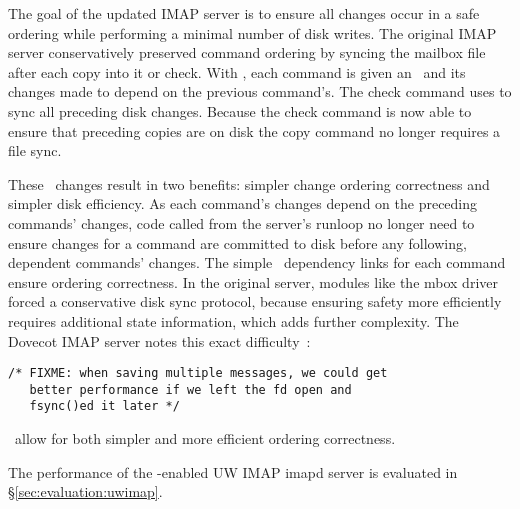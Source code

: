 The goal of the updated IMAP server is to ensure all changes occur in
a safe ordering while performing a minimal number of disk writes.  The
original IMAP server conservatively preserved command ordering by
syncing the mailbox file after each copy into it or check. With
\opgroups, each command is given an \opgroup\ and its changes made to
depend on the previous command's. The check command uses \opgroupSync
to sync all preceding disk changes. Because the check command is now
able to ensure that preceding copies are on disk the copy command no
longer requires a file sync.

These \opgroup\ changes result in two benefits: simpler change
ordering correctness and simpler disk efficiency. As each command's
changes depend on the preceding commands' changes, code called from
the server's runloop no longer need to ensure changes for a command
are committed to disk before any following, dependent commands'
changes. The simple \opgroup\ dependency links for each command ensure
ordering correctness. In the original server, modules like the mbox
driver forced a conservative disk sync protocol, because ensuring
safety more efficiently requires additional state information, which adds
further complexity. The Dovecot IMAP server notes this exact
difficulty~\cite[maildir-save.c]{dovecot}:

\vspace{-0.5\baselineskip}
\begin{scriptsize}
\begin{verbatim}
/* FIXME: when saving multiple messages, we could get
   better performance if we left the fd open and
   fsync()ed it later */
\end{verbatim}
\end{scriptsize}

\vspace{-0.5\baselineskip}
\noindent \Opgroups\ allow for both simpler and more efficient ordering correctness.

The performance of the \opgroup{}-enabled UW IMAP imapd server is
evaluated in \S\ref{sec:evaluation:uwimap}.
